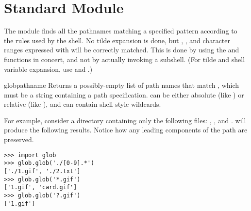 \section{Standard Module }
\label{module-glob}

The  module finds all the pathnames matching a specified
pattern according to the rules used by the \UNIX{} shell.  No tilde
expansion is done, but \code{*}, , and character ranges
expressed with \code{[]} will be correctly matched.  This is done by
using the  and 
functions in concert, and not by actually invoking a subshell.  (For
tilde and shell variable expansion, use 
and .)

\begin{funcdesc}{glob}{pathname}
Returns a possibly-empty list of path names that match ,
which must be a string containing a path specification.
 can be either absolute (like
) or relative (like
), and can contain shell-style wildcards.
\end{funcdesc}

For example, consider a directory containing only the following files:
, , and .  
will produce the following results.  Notice how any leading components
of the path are preserved.

\begin{verbatim}
>>> import glob
>>> glob.glob('./[0-9].*')
['./1.gif', './2.txt']
>>> glob.glob('*.gif')
['1.gif', 'card.gif']
>>> glob.glob('?.gif')
['1.gif']
\end{verbatim}
